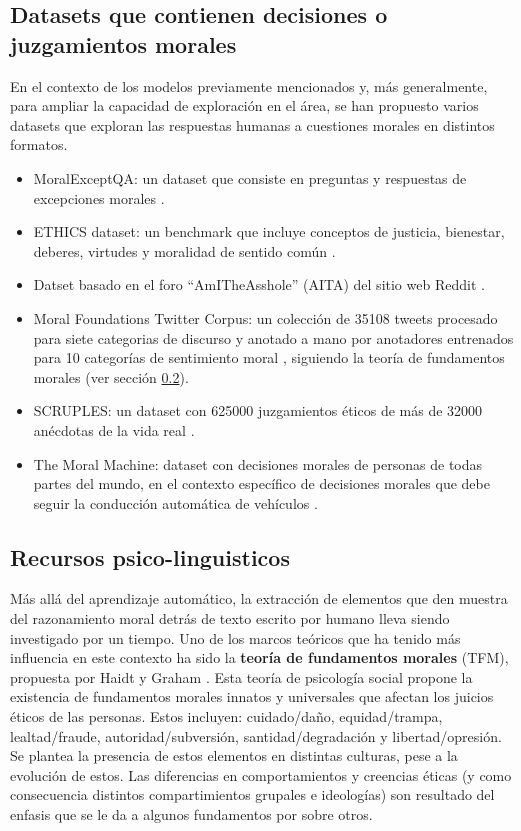\documentclass[
	spanish, %
	letterpaper, oneside
]{article}
\begin{document}
\subsection{Datasets que contienen decisiones o juzgamientos morales}

En el contexto de los modelos previamente mencionados y, más generalmente, para ampliar la capacidad de exploración en el área, se han propuesto varios datasets que exploran las respuestas humanas a cuestiones morales en distintos formatos.

\begin{itemize}
    \item MoralExceptQA: un dataset que consiste en preguntas y respuestas de excepciones morales \cite{Jin}.
    \item ETHICS dataset: un benchmark que incluye conceptos de justicia, bienestar, deberes, virtudes y moralidad de sentido común \cite{Hen}.
    \item Datset basado en el foro ``AmITheAsshole'' (AITA) del sitio web Reddit \cite{aita}.
    \item Moral Foundations Twitter Corpus: un colección de 35108 tweets procesado para siete categorias de discurso y anotado a mano por anotadores entrenados para 10 categorías de sentimiento moral \cite{Hoover}, siguiendo la teoría de fundamentos morales (ver sección \ref{section:rec}).
    \item SCRUPLES: un dataset con 625000 juzgamientos éticos de más de 32000 anécdotas de la vida real \cite{Lourie}.
    \item The Moral Machine: dataset con decisiones morales de personas de todas partes del mundo, en el contexto específico de decisiones morales que debe seguir la conducción automática de vehículos \cite{MM}.
\end{itemize}


\subsection{Recursos psico-linguisticos}
\label{section:rec}

Más allá del aprendizaje automático, la extracción de elementos que den muestra del razonamiento moral detrás de texto escrito por humano lleva siendo investigado por un tiempo. Uno de los marcos teóricos que ha tenido más influencia en este contexto ha sido la \textbf{teoría de fundamentos morales} (TFM), propuesta por Haidt y Graham \cite{tmf,tmf2}. Esta teoría de psicología social propone la existencia de fundamentos morales innatos y universales que afectan los juicios éticos de las personas. Estos incluyen: cuidado/daño, equidad/trampa, lealtad/fraude, autoridad/subversión, santidad/degradación y libertad/opresión. Se plantea la presencia de estos elementos en distintas culturas, pese a la evolución de estos. Las diferencias en comportamientos y creencias éticas (y como consecuencia distintos compartimientos grupales e ideologías) son resultado del enfasis que se le da a algunos fundamentos por sobre otros.
\end{document}
